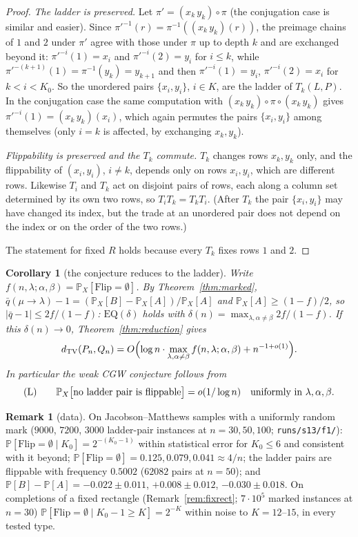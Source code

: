 \documentclass[11pt]{article}
\newtheorem{corollary}[theorem]{Corollary}
\theoremstyle{definition}
\newtheorem{remark}[theorem]{Remark}
\newcommand{\dtv}{d_{\mathrm{TV}}}
\renewcommand{\Pr}{\mathbb{P}}
\newcommand{\PP}{P}
\newcommand{\QQ}{Q}
\begin{document}
\begin{proof}
\emph{The ladder is preserved.}  Let $\pi'=(x_k\,y_k)\circ\pi$ (the
conjugation case is similar and easier).  Since
$\pi'^{-1}(r)=\pi^{-1}((x_k\,y_k)(r))$, the preimage chains of $1$ and
$2$ under $\pi'$ agree with those under $\pi$ up to depth $k$ and are
exchanged beyond it: $\pi'^{-i}(1)=x_i$ and $\pi'^{-i}(2)=y_i$ for
$i\le k$, while $\pi'^{-(k+1)}(1)=\pi^{-1}(y_k)=y_{k+1}$ and then
$\pi'^{-i}(1)=y_i$, $\pi'^{-i}(2)=x_i$ for $k<i<K_0$.  So the unordered
pairs $\{x_i,y_i\}$, $i\in K$, are the ladder of $T_k(L,P)$.  In the
conjugation case the same computation with $(x_k\,y_k)\circ\pi\circ(x_k\,y_k)$
gives $\pi'^{-i}(1)=(x_k\,y_k)(x_i)$, which again permutes the pairs
$\{x_i,y_i\}$ among themselves (only $i=k$ is affected, by exchanging
$x_k,y_k$).

\emph{Flippability is preserved and the $T_k$ commute.}  $T_k$ changes
rows $x_k,y_k$ only, and the flippability of $(x_i,y_i)$, $i\ne k$,
depends only on rows $x_i,y_i$, which are different rows.  Likewise
$T_i$ and $T_k$ act on disjoint pairs of rows, each along a column set
determined by its own two rows, so $T_iT_k=T_kT_i$.  (After $T_k$ the
pair $\{x_i,y_i\}$ may have changed its index, but the trade at an
unordered pair does not depend on the index or on the order of the
two rows.)

The statement for fixed $R$ holds because every $T_k$ fixes rows $1$
and $2$.
\end{proof}

\begin{corollary}[the conjecture reduces to the ladder]\label{cor:ladder}
Write $f(n,\lambda;\alpha,\beta)=\Pr_X[\mathrm{Flip}=\emptyset]$.  By
Theorem~\ref{thm:marked}, $\bar q(\mu\to\lambda)-1=(\Pr_X[B]-\Pr_X[A])/\Pr_X[A]$
and $\Pr_X[A]\ge(1-f)/2$, so $|\bar q-1|\le2f/(1-f)$: $\mathrm{EQ}(\delta)$
holds with $\delta(n)=\max_{\lambda,\alpha\ne\beta}2f/(1-f)$.  If this
$\delta(n)\to0$, Theorem~\ref{thm:reduction} gives
\[
\dtv(\PP_n,\QQ_n)=O\Bigl(\log n\cdot\max_{\lambda,\alpha\ne\beta}
f(n,\lambda;\alpha,\beta)+n^{-1+o(1)}\Bigr).
\]
In particular the weak CGW conjecture follows from
\begin{equation}\label{eq:L}
\textup{(L)}\qquad \Pr_X\bigl[\text{no ladder pair is flippable}\bigr]=o(1/\log n)
\quad\text{uniformly in }\lambda,\alpha,\beta .
\end{equation}
\end{corollary}


\begin{remark}[data]\label{rem:ladderdata}
On Jacobson--Matthews samples with a uniformly random mark ($9000$, $7200$, $3000$ ladder-pair
instances at $n=30,50,100$; \texttt{runs/s13/f1/}): $\Pr[\mathrm{Flip}=\emptyset\mid K_0]=2^{-(K_0-1)}$ within
statistical error for $K_0\le6$ and consistent with it beyond; $\Pr[\mathrm{Flip}=\emptyset]=0.125,0.079,0.041\approx4/n$;
the ladder pairs are flippable with frequency $0.5002$ ($62082$ pairs at $n=50$); and
$\Pr[B]-\Pr[A]=-0.022\pm0.011$, $+0.008\pm0.012$, $-0.030\pm0.018$.  On completions of a
fixed rectangle (Remark~\ref{rem:fixrect}; $7\cdot10^5$ marked instances at $n=30$)
$\Pr[\mathrm{Flip}=\emptyset\mid K_0-1\ge K]=2^{-K}$ within noise to $K=12$--$15$, in
every tested type.
\end{remark}
\end{document}
